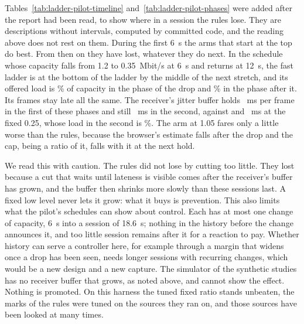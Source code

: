 \begin{table}[t]
\centering\small
\resizebox{\linewidth}{!}{}
\caption{Controller development pilot; added after the report was read. Per capacity phase (6, 6 and 6.6~s): the receiver's jitter buffer per decoded frame, the bytes offered to the relay's sender-to-receiver queue over what its capacity could carry, and the share of them the relay dropped. Queue-building is 1.2, 0.6 and 0.6~Mbit/s; collapse-recovery is 1.2, 0.35 and 1.2~Mbit/s.}
\label{tab:ladder-pilot-phases}
\end{table}

Tables~\ref{tab:ladder-pilot-timeline} and~\ref{tab:ladder-pilot-phases} were added after the report had been read, to show where in a session the rules lose. They are descriptions without intervals, computed by committed code, and the reading above does not rest on them. During the first 6~s the arms that start at the top do best. From then on they have lost, whatever they do next. In the schedule whose capacity falls from 1.2 to 0.35~Mbit/s at 6~s and returns at 12~s, the fast ladder is at the bottom of the ladder by the middle of the next stretch, and its offered load is \LadderPilotDropLoadCollapseFast\% of capacity in the phase of the drop and \LadderPilotDropLoadRecoveryFast\% in the phase after it. Its frames stay late all the same. The receiver's jitter buffer holds \LadderPilotDropBufferCollapseFast~ms per frame in the first of these phases and still \LadderPilotDropBufferRecoveryFast~ms in the second, against \LadderPilotDropBufferCollapseQuarter{} and \LadderPilotDropBufferRecoveryQuarter~ms at the fixed 0.25, whose load in the second is \LadderPilotDropLoadRecoveryQuarter\%. The arm at 1.05 fares only a little worse than the rules, because the browser's estimate falls after the drop and the cap, being a ratio of it, falls with it at the next hold.

We read this with caution. The rules did not lose by cutting too little. They lost because a cut that waits until lateness is visible comes after the receiver's buffer has grown, and the buffer then shrinks more slowly than these sessions last. A fixed low level never lets it grow: what it buys is prevention. This also limits what the pilot's schedules can show about control. Each has at most one change of capacity, 6~s into a session of 18.6~s; nothing in the history before the change announces it, and too little session remains after it for a reaction to pay. Whether history can serve a controller here, for example through a margin that widens once a drop has been seen, needs longer sessions with recurring changes, which would be a new design and a new capture. The simulator of the synthetic studies has no receiver buffer that grows, as noted above, and cannot show the effect. Nothing is promoted. On this harness the tuned fixed ratio stands unbeaten, the marks of the rules were tuned on the sources they ran on, and those sources have been looked at many times.
\fi

